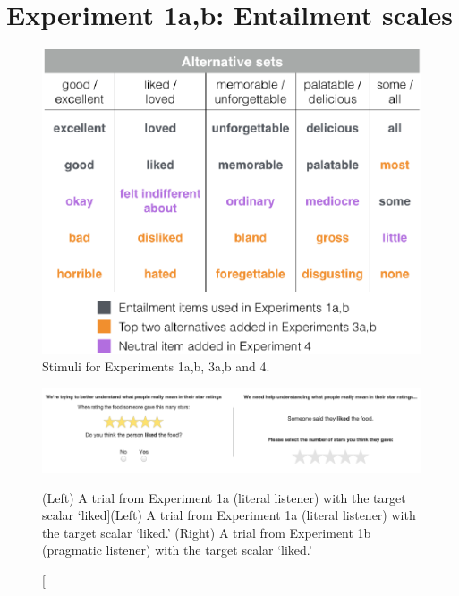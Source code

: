 \documentclass[10pt, letterpaper]{article}
\newenvironment{CodeChunk}{}{}
\begin{document}
\section{Experiment 1a,b: Entailment
scales}\label{experiment-1ab-entailment-scales}

\begin{CodeChunk}
\begin{figure}[t]
\includegraphics{figs/allScalesTable-1} \caption[Stimuli for Experiments 1a,b, 3a,b and 4]{Stimuli for Experiments 1a,b, 3a,b and 4.}\label{fig:allScalesTable}
\end{figure}
\end{CodeChunk}

\begin{CodeChunk}
\captionsetup{width=0.8\textwidth}\begin{figure}[t]

{\centering \includegraphics{figs/stimuli_exp1-1} 

}

\caption[(Left) A trial from Experiment 1a (literal listener) with the target scalar `liked]{(Left) A trial from Experiment 1a (literal listener) with the target scalar `liked.' (Right) A trial from Experiment 1b (pragmatic listener) with the target scalar `liked.'}\label{fig:stimuli_exp1}
\end{figure}
\end{CodeChunk}
\end{document}
